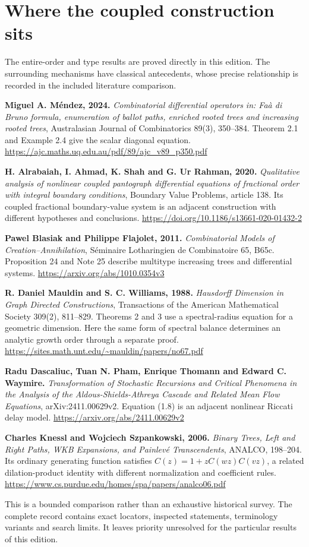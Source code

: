 \section*{Where the coupled construction sits}
The entire-order and type results are proved directly in this edition.
The surrounding mechanisms have classical antecedents, whose precise
relationship is recorded in the included literature comparison.

\textbf{Miguel A. M\'endez, 2024.} \textit{Combinatorial differential operators
in: Fa\`a di Bruno formula, enumeration of ballot paths, enriched rooted trees
and increasing rooted trees}, Australasian Journal of Combinatorics 89(3),
350--384. Theorem 2.1 and Example 2.4 give the scalar diagonal equation.
\url{https://ajc.maths.uq.edu.au/pdf/89/ajc_v89_p350.pdf}

\textbf{H. Alrabaiah, I. Ahmad, K. Shah and G. Ur Rahman, 2020.}
\textit{Qualitative analysis of nonlinear coupled pantograph differential
equations of fractional order with integral boundary conditions}, Boundary
Value Problems, article 138. Its coupled fractional boundary-value system is
an adjacent construction with different hypotheses and conclusions.
\url{https://doi.org/10.1186/s13661-020-01432-2}

\textbf{Pawel Blasiak and Philippe Flajolet, 2011.}
\textit{Combinatorial Models of Creation--Annihilation}, S\'eminaire
Lotharingien de Combinatoire 65, B65c. Proposition 24 and Note 25 describe
multitype increasing trees and differential systems.
\url{https://arxiv.org/abs/1010.0354v3}

\textbf{R. Daniel Mauldin and S. C. Williams, 1988.}
\textit{Hausdorff Dimension in Graph Directed Constructions}, Transactions
of the American Mathematical Society 309(2), 811--829. Theorems 2 and 3 use
a spectral-radius equation for a geometric dimension. Here the same form
of spectral balance determines an analytic growth order through a separate
proof.
\url{https://sites.math.unt.edu/~mauldin/papers/no67.pdf}

\textbf{Radu Dascaliuc, Tuan N. Pham, Enrique Thomann and Edward C. Waymire.}
\textit{Transformation of Stochastic Recursions and Critical Phenomena in the
Analysis of the Aldous-Shields-Athreya Cascade and Related Mean Flow Equations},
arXiv:2411.00629v2. Equation (1.8) is an adjacent nonlinear Riccati delay model.
\url{https://arxiv.org/abs/2411.00629v2}

\textbf{Charles Knessl and Wojciech Szpankowski, 2006.}
\textit{Binary Trees, Left and Right Paths, WKB Expansions, and Painlev\'e
Transcendents}, ANALCO, 198--204. Its ordinary generating function satisfies
$C(z)=1+zC(wz)C(vz)$, a related dilation-product identity with different
normalization and coefficient rules.
\url{https://www.cs.purdue.edu/homes/spa/papers/analco06.pdf}

This is a bounded comparison rather than an exhaustive historical survey. The complete record
contains exact locators, inspected statements, terminology variants and search
limits. It leaves priority unresolved for the particular results of this edition.

